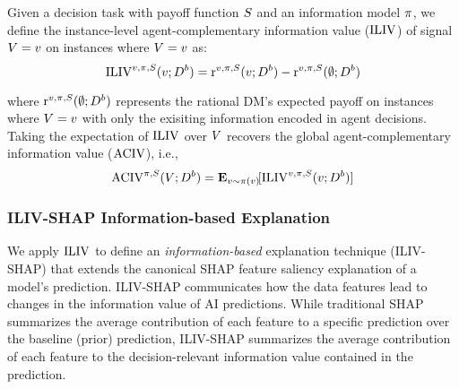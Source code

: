 \begin{definition}
\label{def:RIIV}
Given a decision task with payoff function $S$ and an information model $\pi$, we define the instance-level agent-complementary information value ($\operatorname{ILIV}$) of signal $V = v$ on instances where $V = v$ as:
 \mvspace{-1mm}
\begin{equation}
    \operatorname{ILIV}^{v, \pi, S}(v; D^b) = \mathrm{r}^{v, \pi, S}(v; D^b) - \mathrm{r}^{v, \pi, S}(\emptyset; D^b)
\end{equation}
\end{definition}
 \mvspace{-4mm}
\noindent where $\mathrm{r}^{v, \pi, S}(\emptyset; D^b)$ represents the rational DM's expected payoff on instances where $V = v$ with only the exisiting information encoded in agent decisions.
Taking the expectation of $\operatorname{ILIV}$ over $V$ recovers the global agent-complementary information value ($\operatorname{ACIV}$), i.e.,
\begin{equation}
    \ACIV^{\dgp, \score}(V; \actionvar^b) = \expect[\sigval \sim \dgp(\sigval)]{\ILIV^{\sigval, \dgp, \score}(\sigval; \actionvar^b)}\nonumber
\end{equation}

\subsubsection{ILIV-SHAP Information-based Explanation}

We apply $\operatorname{ILIV}$ to define an \textit{information-based} explanation technique (ILIV-SHAP) that extends the canonical SHAP feature saliency explanation of a model's prediction. ILIV-SHAP communicates how the data features lead to changes in the information value of AI predictions. While traditional SHAP summarizes the average contribution of each feature to a specific prediction over the baseline (prior) prediction, 
ILIV-SHAP summarizes the average contribution of each feature to the decision-relevant information value contained in the prediction. 

